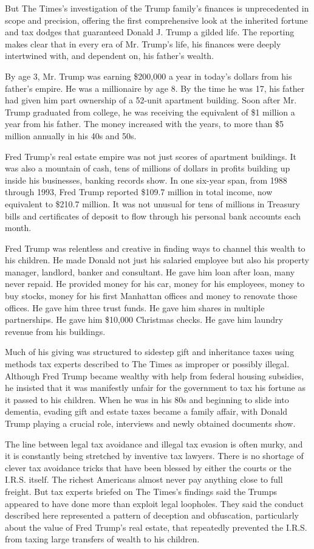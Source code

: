 But The Times's investigation of the Trump family's finances is
unprecedented in scope and precision, offering the first comprehensive
look at the inherited fortune and tax dodges that guaranteed Donald J.
Trump a gilded life. The reporting makes clear that in every era of Mr.
Trump's life, his finances were deeply intertwined with, and dependent
on, his father's wealth.

By age 3, Mr. Trump was earning \$200,000 a year in today's dollars from
his father's empire. He was a millionaire by age 8. By the time he was
17, his father had given him part ownership of a 52-unit apartment
building. Soon after Mr. Trump graduated from college, he was receiving
the equivalent of \$1 million a year from his father. The money
increased with the years, to more than \$5 million annually in his 40s
and 50s.

Fred Trump's real estate empire was not just scores of apartment
buildings. It was also a mountain of cash, tens of millions of dollars
in profits building up inside his businesses, banking records show. In
one six-year span, from 1988 through 1993, Fred Trump reported \$109.7
million in total income, now equivalent to \$210.7 million. It was not
unusual for tens of millions in Treasury bills and certificates of
deposit to flow through his personal bank accounts each month.

Fred Trump was relentless and creative in finding ways to channel this
wealth to his children. He made Donald not just his salaried employee
but also his property manager, landlord, banker and consultant. He gave
him loan after loan, many never repaid. He provided money for his car,
money for his employees, money to buy stocks, money for his first
Manhattan offices and money to renovate those offices. He gave him three
trust funds. He gave him shares in multiple partnerships. He gave him
\$10,000 Christmas checks. He gave him laundry revenue from his
buildings.

Much of his giving was structured to sidestep gift and inheritance taxes
using methods tax experts described to The Times as improper or possibly
illegal. Although Fred Trump became wealthy with help from federal
housing subsidies, he insisted that it was manifestly unfair for the
government to tax his fortune as it passed to his children. When he was
in his 80s and beginning to slide into dementia, evading gift and estate
taxes became a family affair, with Donald Trump playing a crucial role,
interviews and newly obtained documents show.

The line between legal tax avoidance and illegal tax evasion is often
murky, and it is constantly being stretched by inventive tax lawyers.
There is no shortage of clever tax avoidance tricks that have been
blessed by either the courts or the I.R.S. itself. The richest Americans
almost never pay anything close to full freight. But tax experts briefed
on The Times's findings said the Trumps appeared to have done more than
exploit legal loopholes. They said the conduct described here
represented a pattern of deception and obfuscation, particularly about
the value of Fred Trump's real estate, that repeatedly prevented the
I.R.S. from taxing large transfers of wealth to his children.


